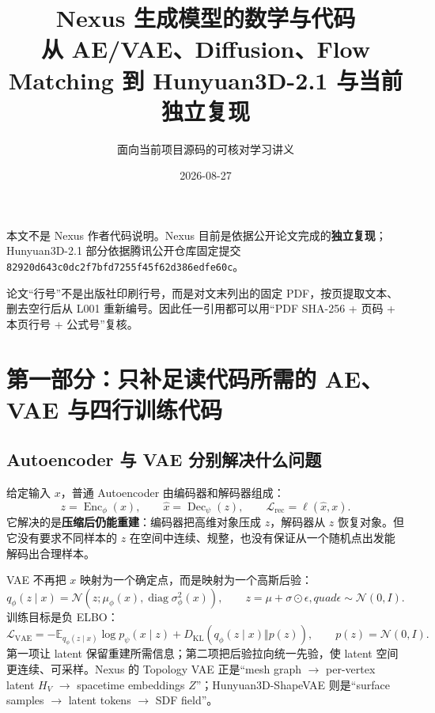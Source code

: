 \documentclass[11pt,a4paper]{ctexart}
\title{\vspace{-1.5cm}\textbf{Nexus 生成模型的数学与代码}\\[0.5em]
\large 从 AE/VAE、Diffusion、Flow Matching 到 Hunyuan3D-2.1 与当前独立复现}
\author{面向当前项目源码的可核对学习讲义}
\date{2026-08-27}
\newcommand{\E}{\mathbb{E}}
\newcommand{\N}{\mathcal{N}}
\newcommand{\KL}{D_{\mathrm{KL}}}
\DeclareMathOperator{\diag}{diag}
\begin{document}
\maketitle

\begin{warnbox}[使用边界]
本文不是 Nexus 作者代码说明。Nexus 目前是依据公开论文完成的\textbf{独立复现}；Hunyuan3D-2.1 部分依据腾讯公开仓库固定提交
\texttt{82920d643c0dc2f7bfd7255f45f62d386edfe60c}。

论文“行号”不是出版社印刷行号，而是对文末列出的固定 PDF，按页提取文本、删去空行后从 L001 重新编号。因此任一引用都可以用“PDF SHA-256 + 页码 + 本页行号 + 公式号”复核。
\end{warnbox}

\tableofcontents
\newpage

\section{第一部分：只补足读代码所需的 AE、VAE 与四行训练代码}

\subsection*{Autoencoder 与 VAE 分别解决什么问题}

给定输入 $x$，普通 Autoencoder 由编码器和解码器组成：
\begin{equation}
z=\operatorname{Enc}_{\phi}(x),\qquad \hat x=\operatorname{Dec}_{\psi}(z),\qquad
\mathcal L_{\mathrm{rec}}=\ell(\hat x,x).
\end{equation}
它解决的是\textbf{压缩后仍能重建}：编码器把高维对象压成 $z$，解码器从 $z$ 恢复对象。但它没有要求不同样本的 $z$ 在空间中连续、规整，也没有保证从一个随机点出发能解码出合理样本。

VAE 不再把 $x$ 映射为一个确定点，而是映射为一个高斯后验：
\begin{equation}
q_{\phi}(z\mid x)=\N\!\left(z;\mu_{\phi}(x),\diag\sigma^2_{\phi}(x)\right),
\qquad z=\mu+\sigma\odot\epsilon,quad\epsilon\sim\N(0,I).
\end{equation}
训练目标是负 ELBO：
\begin{equation}
\mathcal L_{\mathrm{VAE}}
=-\E_{q_{\phi}(z\mid x)}\log p_{\psi}(x\mid z)
+\KL\!\left(q_{\phi}(z\mid x)\Vert p(z)\right),\qquad p(z)=\N(0,I).
\end{equation}
第一项让 latent 保留重建所需信息；第二项把后验拉向统一先验，使 latent 空间更连续、可采样。Nexus 的 Topology VAE 正是“mesh graph $\to$ per-vertex latent $H_V$ $\to$ spacetime embeddings $Z$”；Hunyuan3D-ShapeVAE 则是“surface samples $\to$ latent tokens $\to$ SDF field”。
\end{document}
